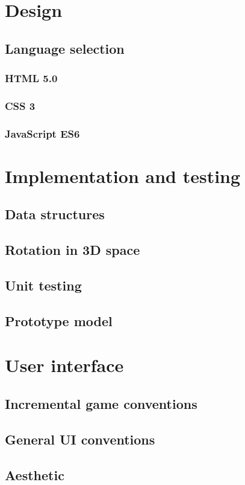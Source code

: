 \documentclass[twoside]{bhamthesis}
\begin{document}
\section{Design}
\subsection{Language selection}
\subsubsection{HTML 5.0}
\subsubsection{CSS 3}
\subsubsection{JavaScript ES6}

\section{Implementation and testing}
\subsection{Data structures}
\subsection{Rotation in 3D space}
\subsection{Unit testing}
\subsection{Prototype model}

\section{User interface}
\subsection{Incremental game conventions}
\subsection{General UI conventions}
\subsection{Aesthetic}
\end{document}
